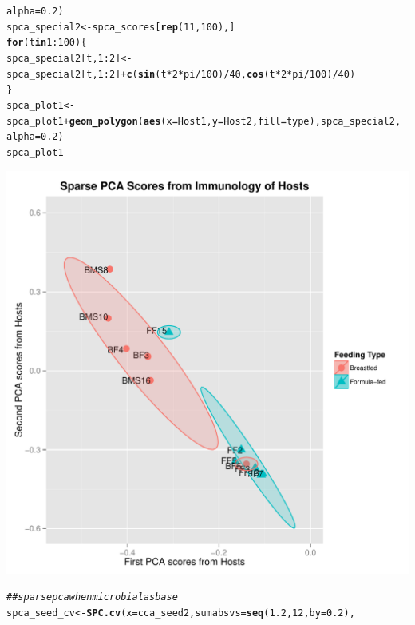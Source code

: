 \documentclass[12pt]{article}\usepackage[]{graphicx}\usepackage[]{color}
\makeatletter
\def\maxwidth{ %
  \ifdim\Gin@nat@width>\linewidth
    \linewidth
  \else
    \Gin@nat@width
  \fi
}
\newcommand{\hlnum}[1]{\textcolor[rgb]{0.686,0.059,0.569}{#1}}%
\newcommand{\hlcom}[1]{\textcolor[rgb]{0.678,0.584,0.686}{\textit{#1}}}%
\newcommand{\hlopt}[1]{\textcolor[rgb]{0,0,0}{#1}}%
\newcommand{\hlstd}[1]{\textcolor[rgb]{0.345,0.345,0.345}{#1}}%
\newcommand{\hlkwa}[1]{\textcolor[rgb]{0.161,0.373,0.58}{\textbf{#1}}}%
\newcommand{\hlkwb}[1]{\textcolor[rgb]{0.69,0.353,0.396}{#1}}%
\newcommand{\hlkwc}[1]{\textcolor[rgb]{0.333,0.667,0.333}{#1}}%
\newcommand{\hlkwd}[1]{\textcolor[rgb]{0.737,0.353,0.396}{\textbf{#1}}}%
\newenvironment{kframe}{%
 \def\at@end@of@kframe{}%
 \ifinner\ifhmode%
  \def\at@end@of@kframe{\end{minipage}}%
  \begin{minipage}{\columnwidth}%
 \fi\fi%
 \def\FrameCommand##1{\hskip\@totalleftmargin \hskip-\fboxsep
 \colorbox{shadecolor}{##1}\hskip-\fboxsep
     \hskip-\linewidth \hskip-\@totalleftmargin \hskip\columnwidth}%
 \MakeFramed {\advance\hsize-\width
   \@totalleftmargin\z@ \linewidth\hsize
   \@setminipage}}%
 {\par\unskip\endMakeFramed%
 \at@end@of@kframe}
\newenvironment{knitrout}{}{} %
\makeatother
\begin{document}
\begin{knitrout}
\begin{kframe}
\begin{alltt}
                                    \hlkwc{alpha}\hlstd{=}\hlnum{0.2}\hlstd{)}
\hlstd{spca_special2}\hlkwb{<-}\hlstd{spca_scores[}\hlkwd{rep}\hlstd{(}\hlnum{11}\hlstd{,}\hlnum{100}\hlstd{),]}
\hlkwa{for}\hlstd{(t} \hlkwa{in} \hlnum{1}\hlopt{:}\hlnum{100}\hlstd{)\{}
 \hlstd{spca_special2[t,}\hlnum{1}\hlopt{:}\hlnum{2}\hlstd{]}\hlkwb{<-}\hlstd{spca_special2[t,}\hlnum{1}\hlopt{:}\hlnum{2}\hlstd{]}\hlopt{+}\hlkwd{c}\hlstd{(}\hlkwd{sin}\hlstd{(t}\hlopt{*}\hlnum{2}\hlopt{*}\hlstd{pi}\hlopt{/}\hlnum{100}\hlstd{)}\hlopt{/}\hlnum{40}\hlstd{,}\hlkwd{cos}\hlstd{(t}\hlopt{*}\hlnum{2}\hlopt{*}\hlstd{pi}\hlopt{/}\hlnum{100}\hlstd{)}\hlopt{/}\hlnum{40}\hlstd{)}
\hlstd{\}}
\hlstd{spca_plot1}\hlkwb{<-}\hlstd{spca_plot1}\hlopt{+}\hlkwd{geom_polygon}\hlstd{(}\hlkwd{aes}\hlstd{(}\hlkwc{x}\hlstd{=Host1,}\hlkwc{y}\hlstd{=Host2,}\hlkwc{fill}\hlstd{=type),spca_special2,}
                                    \hlkwc{alpha}\hlstd{=}\hlnum{0.2}\hlstd{)}
\hlstd{spca_plot1}
\end{alltt}
\end{kframe}
\includegraphics[width=\maxwidth]{figure/sparse_pca-1} 
\begin{kframe}\begin{alltt}
\hlcom{## sparse pca when microbial as base}
\hlstd{spca_seed_cv}\hlkwb{<-}\hlkwd{SPC.cv}\hlstd{(}\hlkwc{x}\hlstd{=cca_seed2,}\hlkwc{sumabsvs}\hlstd{=}\hlkwd{seq}\hlstd{(}\hlnum{1.2}\hlstd{,}\hlnum{12}\hlstd{,}\hlkwc{by}\hlstd{=}\hlnum{0.2}\hlstd{),}

\end{alltt}
\end{kframe}
\end{knitrout}
\end{document}
